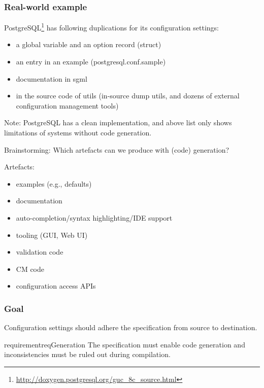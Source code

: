 \begin{frame}[fragile]
	\frametitle{Real-world example}
	PostgreSQL\footnote{\url{http://doxygen.postgresql.org/guc_8c_source.html}} has following duplications for its configuration settings:
	\begin{itemize}
	\item a global variable and an option record (struct)
	\item an entry in an example (postgresql.conf.sample)
	\item documentation in sgml
	\item in the source code of utils (in-source dump utils, and dozens of external configuration management tools)
	\end{itemize}
	\pause
	\vspace{1em}
	Note: PostgreSQL has a clean implementation, and above list only shows limitations of systems without code generation.
\end{frame}

\begin{assignment}
	\begin{task}
	Brainstorming: Which artefacts can we produce with (code) generation?
	\end{task}
\end{assignment}

\begin{frame}
	Artefacts:
	\begin{itemize}
	\item examples (e.g., defaults)
	\item documentation
	\item auto-completion/syntax highlighting/IDE support
	\item tooling (GUI, Web UI)
	\item validation code
	\item CM code
	\item configuration access APIs
	\end{itemize}
\end{frame}

\begin{frame}
	\frametitle{Goal}

	\begin{goal}
	Configuration settings should adhere the specification from source to destination.
	\end{goal}

	\begin{restatable}{requirement}{reqGeneration}
	The specification must enable code generation and inconsistencies must be ruled out during compilation.
	\end{restatable}
\end{frame}


